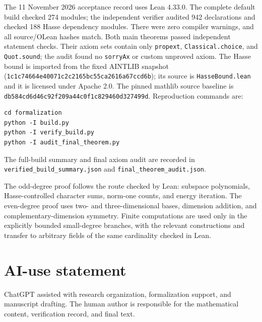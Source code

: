 \documentclass[11pt]{amsart}
\numberwithin{equation}{section}
\theoremstyle{definition}
\theoremstyle{remark}
\begin{document}
{\raggedright
The 11 November 2026 acceptance record uses Lean 4.33.0. The complete default build checked 274 modules; the independent verifier audited 942 declarations and checked 188 Hasse dependency modules. There were zero compiler warnings, and all source/OLean hashes match.
Both main theorems passed independent statement checks. Their axiom sets contain only \texttt{propext}, \texttt{Classical.choice}, and \texttt{Quot.sound}; the audit found no \texttt{sorryAx} or custom unproved axiom.
The Hasse bound is imported from the fixed AINTLIB snapshot~\cite{AINTLIB} (\texttt{1c1c7466\allowbreak 4e40071c\allowbreak 2c2165bc\allowbreak 55ca2616\allowbreak a67ccd6b}); its source is \texttt{HasseBound.lean} and it is licensed under Apache 2.0.
The pinned mathlib source baseline is \texttt{db584cd6\allowbreak d46c92f2\allowbreak 09a44c0f\allowbreak 1c829460\allowbreak d327499d}. Reproduction commands are:
\par}
\begin{verbatim}
cd formalization
python -I build.py
python -I verify_build.py
python -I audit_final_theorem.py
\end{verbatim}
The full-build summary and final axiom audit are recorded in \texttt{verified\_build\_summary.json} and \texttt{final\_theorem\_audit.json}.

The odd-degree proof follows the route checked by Lean: subspace polynomials, Hasse-controlled character sums, norm-one counts, and energy iteration. The even-degree proof uses two- and three-dimensional bases, dimension addition, and complementary-dimension symmetry. Finite computations are used only in the explicitly bounded small-degree branches, with the relevant constructions and transfer to arbitrary fields of the same cardinality checked in Lean.

\section*{AI-use statement}
ChatGPT assisted with research organization, formalization support, and manuscript drafting. The human author is responsible for the mathematical content, verification record, and final text.
\end{document}
